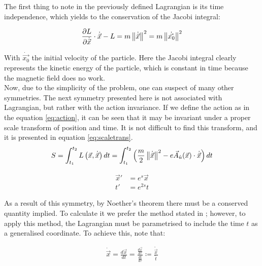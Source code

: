 The first thing to note in the previously defined Lagrangian is its time independence, which yields to the conservation of the Jacobi integral:

\begin{equation*}
 \frac{\partial L}{\partial\dot{\vec{x}}}\cdot\dot{\vec{x}} - L = m\left\lVert \dot{\vec{x}} \right\rVert^2                    =m\left\lVert \dot{\vec{x_0}} \right\rVert^2 
\end{equation*}

With $\dot{\vec{x_0}}$ the initial velocity of the particle. Here the Jacobi integral clearly represents the kinetic energy of the particle, which is constant in time because the magnetic field does no work.\\

Now, due to the simplicity of the problem, one can suspect of many other symmetries. The next symmetry presented here is not associated with Lagrangian, but rather with the action invariance. If we define the action as in the equation \eqref{eq:action}, it can be seen that it may be invariant under a proper scale transform of position and time. It is not difficult to find this transform, and it is presented in equation \eqref{eq:scaletrans}.\\

\begin{equation}
S = \int_{t_1}^{t_2}L\left( \vec{x},\dot{\vec{x}} \right)dt = \int_{t_1}^{t_2}\left( \frac{m}{2}\left\lVert \dot{\vec{x}} \right\rVert^2 - e\vec{A}_{\hat{u}}(\vec{x})\cdot\dot{\vec{x}} \right)dt 
\label{eq:action}
\end{equation}

\begin{equation}
\begin{aligned}
\vec{x}' &= e^{s}\vec{x}\\
t'&= e^{2s}t
\end{aligned}
\label{eq:scaletrans}
\end{equation}

As a result of this symmetry, by Noether's theorem there must be a conserved quantity implied. To calculate it we prefer the method stated in \cite[Thm on Integrable Systems]{scheck}; however, to apply this method, the Lagrangian must be parametrised to include the time $t$ as a generalised coordinate. To achieve this, note that:

\begin{align*}
\dot{\vec{x}} = \frac{d\vec{x}}{dt} = \frac{\frac{d\vec{x}}{d\tau}}{\frac{dt}{d\tau}} \coloneqq \frac{\mathring{\vec{x}}}{\mathring{t}}
\end{align*}

